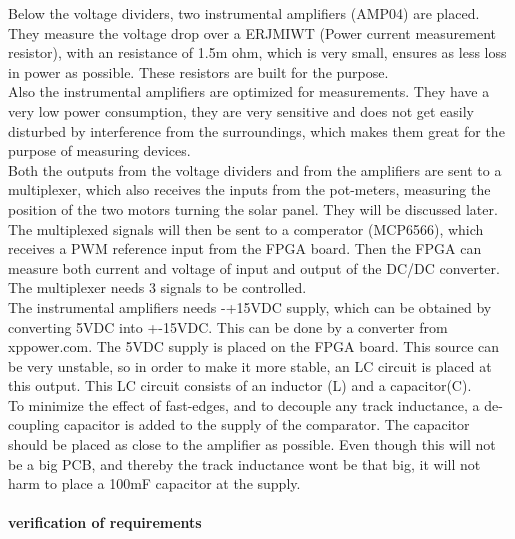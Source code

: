 Below the voltage dividers, two instrumental amplifiers (AMP04) are placed. They measure the voltage drop over a ERJMIWT (Power current measurement resistor), with an resistance of 1.5m ohm, which is very small, ensures as less loss in power as possible. These resistors are built for the purpose. \\
Also the instrumental amplifiers are optimized for measurements. They have a very low power consumption, they are very sensitive and does not get easily disturbed by interference from the surroundings, which makes them great for the purpose of measuring devices. \\
Both the outputs from the voltage dividers and from the amplifiers are sent to a multiplexer, which also receives the inputs from the pot-meters, measuring the position of the two motors turning the solar panel. They will be discussed later. The multiplexed signals will then be sent to a comperator (MCP6566), which receives a PWM reference input from the FPGA board. Then the FPGA can measure both current and voltage of input and output of the DC/DC converter. The multiplexer needs 3 signals to be controlled. \\
The instrumental amplifiers needs -+15VDC supply, which can be obtained by converting 5VDC into +-15VDC. This can be done by a converter from xppower.com. The 5VDC supply is placed on the FPGA board. This source can be very unstable, so in order to make it more stable, an LC circuit is placed at this output. This LC circuit consists of an inductor (L) and a capacitor(C). \\
To minimize the effect of fast-edges, and to decouple any track inductance, a de-coupling capacitor is added to the supply of the comparator. The capacitor should be placed as close to the amplifier as possible. Even though this will not be a big PCB, and thereby the track inductance wont be that big, it will not harm to place a 100mF capacitor at the supply. 


\paragraph{verification of requirements}\mbox{}\\

